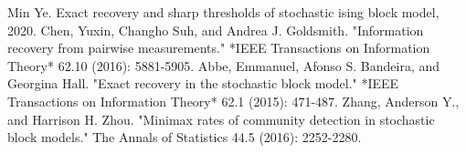 \documentclass{article}
\begin{document}
\begin{thebibliography}{1}
	

	Min Ye.
	\newblock Exact recovery and sharp thresholds of stochastic ising block model,
	2020.
	Chen, Yuxin, Changho Suh, and Andrea J. Goldsmith. "Information recovery from pairwise measurements." *IEEE Transactions on Information Theory* 62.10 (2016): 5881-5905.
	Abbe, Emmanuel, Afonso S. Bandeira, and Georgina Hall. "Exact recovery in the stochastic block model." *IEEE Transactions on Information Theory* 62.1 (2015): 471-487.
	Zhang, Anderson Y., and Harrison H. Zhou. "Minimax rates of community detection in stochastic block models." The Annals of Statistics 44.5 (2016): 2252-2280.
\end{thebibliography}
\end{document}
